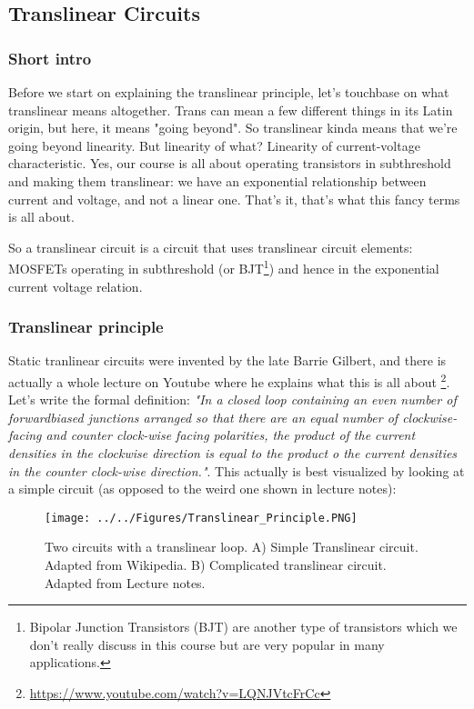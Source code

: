 \subsection{Translinear Circuits}

\subsubsection{Short intro}

Before we start on explaining the translinear principle, let's touchbase on what translinear means altogether. Trans can mean a few different things in its Latin origin, but here, it means "going beyond". So translinear kinda means that we're going beyond linearity. But linearity of what? Linearity of current-voltage characteristic. Yes, our course is all about operating transistors in subthreshold and making them translinear: we have an exponential relationship between current and voltage, and not a linear one. That's it, that's what this fancy terms is all about. 

So a translinear circuit is a circuit that uses translinear circuit elements: MOSFETs operating in subthreshold (or BJT\footnote{Bipolar Junction Transistors (BJT) are another type of transistors which we don't really discuss in this course but are very popular in many applications.}) and hence in the exponential current voltage relation. 

\subsubsection{Translinear principle}\label{sec:translinear_principle}

Static tranlinear circuits were invented by the late Barrie Gilbert, and there is actually a whole lecture on Youtube where he explains what this is all about \footnote{\url{https://www.youtube.com/watch?v=LQNJVtcFrCc}}. Let's write the formal definition: \textit{"In a closed loop containing an even number of forwardbiased junctions arranged so that there are an equal number of clockwise-facing and counter clock-wise facing polarities, the product of the current densities in the clockwise direction is equal to the product o the current densities in the counter clock-wise direction."}. This actually is best visualized by looking at a simple circuit (as opposed to the weird one shown in lecture notes):


\begin{figure}[H]
    \centering
    \texttt{[image: ../../Figures/Translinear\_Principle.PNG]}
    \caption{Two circuits with a translinear loop. A) Simple Translinear circuit. Adapted from Wikipedia. B) Complicated translinear circuit. Adapted from Lecture notes.}
    \label{fig:Translinear Principle}
\end{figure}

